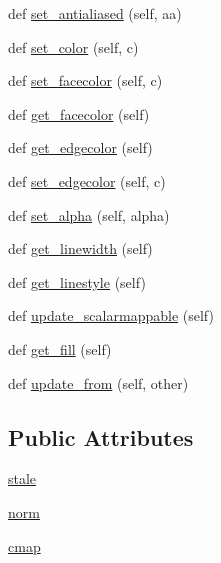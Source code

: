 \begin{DoxyCompactItemize}
def \hyperlink{classmatplotlib_1_1collections_1_1Collection_a3c581a16ef2582704f8653e27a6f3065}{set\+\_\+antialiased} (self, aa)
\item 
def \hyperlink{classmatplotlib_1_1collections_1_1Collection_a07f68643c8a7d9041d17f9325c5c7f97}{set\+\_\+color} (self, c)
\item 
def \hyperlink{classmatplotlib_1_1collections_1_1Collection_aed353579b36577d0483167f64fb4f9ef}{set\+\_\+facecolor} (self, c)
\item 
def \hyperlink{classmatplotlib_1_1collections_1_1Collection_ac710bd0fcd9df8e3da49bf20a7d5fcc1}{get\+\_\+facecolor} (self)
\item 
def \hyperlink{classmatplotlib_1_1collections_1_1Collection_aa9eeced1e235b3ab138985c2300d69fd}{get\+\_\+edgecolor} (self)
\item 
def \hyperlink{classmatplotlib_1_1collections_1_1Collection_a323d180ec29ecd4878b0502cb7f8c9d0}{set\+\_\+edgecolor} (self, c)
\item 
def \hyperlink{classmatplotlib_1_1collections_1_1Collection_a13d51bba55c0e46154330e7559cea9e5}{set\+\_\+alpha} (self, alpha)
\item 
def \hyperlink{classmatplotlib_1_1collections_1_1Collection_a2dd8714661b900cc6a918f2080418334}{get\+\_\+linewidth} (self)
\item 
def \hyperlink{classmatplotlib_1_1collections_1_1Collection_ad9b7a178779b2f1f97ac4d2af81b2a06}{get\+\_\+linestyle} (self)
\item 
def \hyperlink{classmatplotlib_1_1collections_1_1Collection_a132faeb3364d2b65c136f61ca6e47487}{update\+\_\+scalarmappable} (self)
\item 
def \hyperlink{classmatplotlib_1_1collections_1_1Collection_a296a5b2a045655cfb7d3e0a1e6918809}{get\+\_\+fill} (self)
\item 
def \hyperlink{classmatplotlib_1_1collections_1_1Collection_affaa099f3fe01ba427144742ba9781ba}{update\+\_\+from} (self, other)
\end{DoxyCompactItemize}
\subsection*{Public Attributes}
\begin{DoxyCompactItemize}
\item 
\hyperlink{classmatplotlib_1_1collections_1_1Collection_abb8317ac99bd1956e40828e682681c4d}{stale}
\item 
\hyperlink{classmatplotlib_1_1collections_1_1Collection_a154db555ac4f8bb3d0d342ce30c2f7b1}{norm}
\item 
\hyperlink{classmatplotlib_1_1collections_1_1Collection_a7f884e899bdd39bd11811fe94920776b}{cmap}
\end{DoxyCompactItemize}
